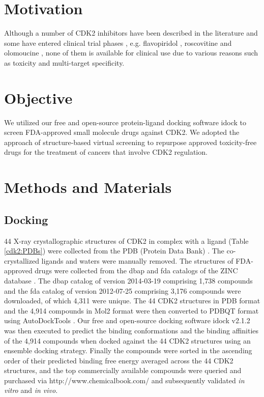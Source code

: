 \section{Motivation}

Although a number of CDK2 inhibitors have been described in the literature and some have entered clinical trial phases \citep{1603}, e.g. flavopiridol \citep{1596}, roscovitine \citep{1597} and olomoucine \citep{1598}, none of them is available for clinical use due to various reasons such as toxicity and multi-target specificity.

\section{Objective}

We utilized our free and open-source protein-ligand docking software idock \citep{1153,1362} to screen FDA-approved small molecule drugs against CDK2. We adopted the approach of structure-based virtual screening to repurpose approved toxicity-free drugs for the treatment of cancers that involve CDK2 regulation.

\section{Methods and Materials}

\subsection{Docking}

44 X-ray crystallographic structures of CDK2 in complex with a ligand (Table \ref{cdk2:PDBs}) were collected from the PDB (Protein Data Bank) \citep{540,537}. The co-crystallized ligands and waters were manually removed. The structures of FDA-approved drugs were collected from the dbap and fda catalogs of the ZINC database \citep{532,1178}. The dbap catalog of version 2014-03-19 comprising 1,738 compounds and the fda catalog of version 2012-07-25 comprising 3,176 compounds were downloaded, of which 4,311 were unique. The 44 CDK2 structures in PDB format and the 4,914 compounds in Mol2 format were then converted to PDBQT format using AutoDockTools \citep{596}. Our free and open-source docking software idock v2.1.2 \citep{1153,1362} was then executed to predict the binding conformations and the binding affinities of the 4,914 compounds when docked against the 44 CDK2 structures using an ensemble docking strategy. Finally the compounds were sorted in the ascending order of their predicted binding free energy averaged across the 44 CDK2 structures, and the top commercially available compounds were queried and purchased via http://www.chemicalbook.com/ and subsequently validated \textit{in vitro} and \textit{in vivo}.

